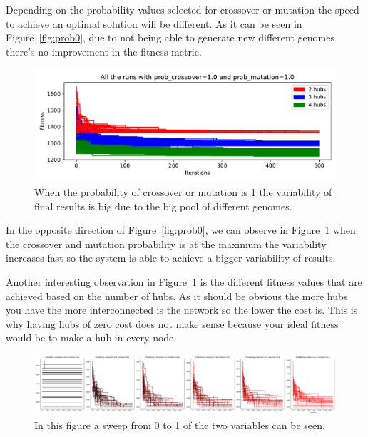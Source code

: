 \documentclass[12pt,oneside,a4paper]{article}
\begin{document}
    Depending on the probability values selected for crossover or mutation the speed to achieve an optimal solution
    will be different.
    As it can be seen in Figure~\ref{fig:prob0}, due to not being able to generate new different genomes
    there's no improvement in the fitness metric.

    \begin{figure}[h]
        \includegraphics[width=\textwidth]{max_cross_mut}
        \caption{When the probability of crossover or mutation is 1 the variability of final results is big due to
        the big pool of different genomes.}
        \label{fig:prob1}
    \end{figure}

    In the opposite direction of Figure~\ref{fig:prob0}, we can observe in Figure~\ref{fig:prob1} when the crossover
    and mutation probability is at the maximum the variability increases fast so the system is able to achieve a
    bigger variability of results.

    Another interesting observation in Figure~\ref{fig:prob1} is the different fitness values that are achieved based on
    the number of hubs.
    As it should be obvious the more hubs you have the more interconnected is the network so the lower the cost is.
    This is why having hubs of zero cost does not make sense because your ideal fitness would be to make a hub in
    every node.

    \begin{figure}[h]
        \includegraphics[width=\textwidth]{sweep_values_get_best_fitness}
        \caption{In this figure a sweep from 0 to 1 of the two variables can be seen.}
        \label{fig:sweep_best}
    \end{figure}
\end{document}
